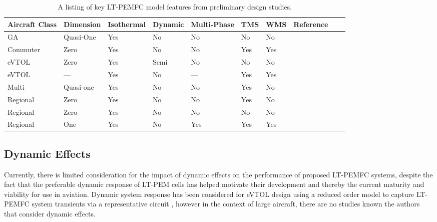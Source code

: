 \begin{center}
	\begin{table}[H]
		\begin{tabularx}{\linewidth}{Y Y Y Y Y Y Y Y Y Y}
			\toprule
			Aircraft Class & Dimension & Isothermal & Dynamic & Multi-Phase & TMS & WMS & Reference                                             \\
			\midrule
			GA             & Quasi-One & Yes        & No      & No          & No  & No  & \cite{nicolayConceptualDesignOptimization2021b}       \\
			Commuter       & Zero      & Yes        & No      & No          & Yes & Yes & \cite{abukasimPerformanceFailureAnalysis2022a}        \\
			eVTOL          & Zero      & Yes        & Semi    & No          & No  & No  & \cite{ngHydrogenFuelCells2019a}                       \\
			eVTOL          & ---       & Yes        & No      & ---         & Yes & Yes & \cite{parkRefinedSizingMethod2022}                    \\
			Multi          & Quasi-one & Yes        & No      & No          & Yes & No  & \cite{chiaramassaroOptimalDesignHydrogenpowered2024a} \\
			Regional       & Zero      & Yes        & No      & No          & Yes & No  & \cite{schmelcherHydrogenFuelCells2022a}               \\
			Regional       & Zero      & Yes        & No      & No          & No  & No  & \cite{sparanoFutureTechnologicalPotential2023a}       \\
			Regional       & One       & Yes        & No      & Yes         & Yes & Yes & \cite{schroderOptimalDesignProton2024}                \\
			\bottomrule
		\end{tabularx}
		\label{tab:studies}
		\medskip
		\caption{A listing of key LT-PEMFC model features from preliminary design studies.}
	\end{table}
\end{center}

\subsection{Dynamic Effects} \label{sec:effects}
Currently, there is limited consideration for the impact of dynamic effects on the performance of proposed LT-PEMFC systems, despite the fact that the preferable dynamic response of LT-PEM cells has helped motivate their development and thereby the current maturity and viability for use in aviation.
Dynamic system response has been considered for eVTOL design using a reduced order model to capture LT-PEMFC system transients via a representative circuit \cite{ngHydrogenFuelCells2019a}, however in the context of large aircraft, there are no studies known the authors that consider dynamic effects.

